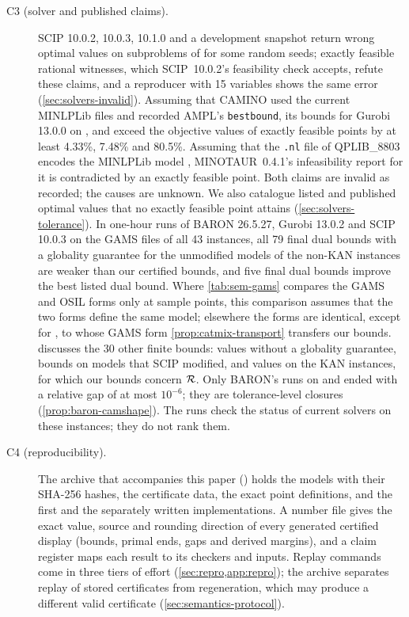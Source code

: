 \begin{description}
\item[C3 (solver and published claims).]
SCIP 10.0.2, 10.0.3, 10.1.0 and a development snapshot \citep{hojny2025-the-scip-optimization-suite-10} return wrong optimal values on subproblems of  for some random seeds; exactly feasible rational witnesses, which SCIP~10.0.2's feasibility check accepts, refute these claims, and a reproducer with 15 variables shows the same error (\cref{sec:solvers-invalid}).
Assuming that CAMINO used the current MINLPLib files and recorded AMPL's \texttt{bestbound}, its bounds for Gurobi 13.0.0 on ,  and  \citep{ghezzi2026-camino-benchmark-results-for-nonconvex} exceed the objective values of exactly feasible points by at least 4.33\%, 7.48\% and 80.5\%.
Assuming that the \texttt{.nl} file of QPLIB\_8803 encodes the MINLPLib model , MINOTAUR~0.4.1's infeasibility report for it is contradicted by an exactly feasible point.
Both claims are invalid as recorded; the causes are unknown.
We also catalogue listed and published optimal values that no exactly feasible point attains (\cref{sec:solvers-tolerance}).
In one-hour runs of BARON 26.5.27, Gurobi 13.0.2 and SCIP 10.0.3 on the GAMS files of all 43 instances, all 79 final dual bounds with a globality guarantee for the unmodified models of the non-KAN instances are weaker than our certified bounds, and five final dual bounds improve the best listed dual bound.
Where \cref{tab:sem-gams} compares the GAMS and OSIL forms only at sample points, this comparison assumes that the two forms define the same model; elsewhere the forms are identical, except for , to whose GAMS form \cref{prop:catmix-transport} transfers our bounds.
 discusses the 30 other finite bounds: values without a globality guarantee, bounds on models that SCIP modified, and values on the KAN instances, for which our bounds concern $\mathcal{R}$.
Only BARON's runs on  and  ended with a relative gap of at most $10^{-6}$; they are tolerance-level closures (\cref{prop:baron-camshape}).
The runs check the status of current solvers on these instances; they do not rank them.

\item[C4 (reproducibility).]
The archive that accompanies this paper (\archiveDOI) holds the models with their SHA-256 hashes, the certificate data, the exact point definitions, and the first and the separately written implementations.
A number file gives the exact value, source and rounding direction of every generated certified display (bounds, primal ends, gaps and derived margins), and a claim register maps each result to its checkers and inputs.
Replay commands come in three tiers of effort (\cref{sec:repro,app:repro}); the archive separates replay of stored certificates from regeneration, which may produce a different valid certificate (\cref{sec:semantics-protocol}).
\end{description}

